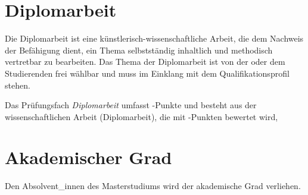 %


\section{Diplomarbeit}\label{sec:DA}

\newcommand*\PFDA{%
  \ifDASEMINAR{%
    \LV{1,5}{1,0}{SE}{Seminar für Diplomand\_innen}[SeminarFuerDiplomandInnen]\\
    \ECTS{27,0} \hspace*{1.5mm} Diplomarbeit \\
    \hspace*{0.9mm} \ECTS{1,5} \hspace*{1.6mm} Kommissionelle Abschlussprüfung%
  }{%
    \ECTS{27,0} \hspace*{0.5mm} Diplomarbeit \\
    \hspace*{0.9mm} \ECTS{3,0} \hspace*{1.6mm} Kommissionelle Abschlussprüfung%
  }%
}
\let\PFDASem\PFDA %

Die Diplomarbeit ist eine künstlerisch-wissenschaftliche Arbeit, die 
dem Nachweis der Befähigung dient, ein Thema selbstständig
inhaltlich und methodisch vertretbar zu bearbeiten. Das Thema der
Diplomarbeit ist von der oder dem Studierenden frei wählbar und muss
im Einklang mit dem Qualifikationsprofil stehen.

Das Prüfungsfach \emph{Diplomarbeit} umfasst -Punkte
und besteht aus der wissenschaftlichen Arbeit (Diplomarbeit),
die mit -Punkten bewertet wird,

%

\section{Akademischer Grad}\label{sec:AG}

Den Absolvent\_innen 
des Masterstudiums \emph{} wird der akademische Grad
verliehen.

